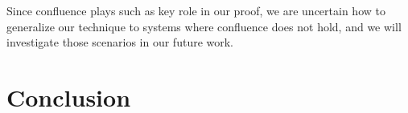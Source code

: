 \documentclass[acmsmall,screen=true,
\ifpublic review=false\else,review=true\fi
  ,anonymous=\ifanonymous true\else false\fi]{acmart}
\newcommand{\lang}{$\lambda^H$\xspace}
\newcommand{\scw}[1]{}
\begin{document}
Since confluence plays such as key role in our proof, we are uncertain
how to generalize our technique to systems where confluence does not
hold, and we will investigate those scenarios in our future work.
\scw{What systems are you thinking of? Or do you mean more generally
that this technique only works for languages where the definition of
equality is based on joinability of parallel reduction?}





\section{Conclusion}
\label{sec:conclusion}








\end{document}
